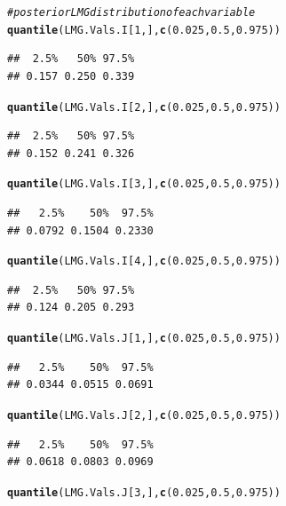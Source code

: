 \documentclass[11pt,a4paper,twoside]{book}\usepackage[]{graphicx}\usepackage[]{color}
\makeatletter
\newcommand{\hlnum}[1]{\textcolor[rgb]{0.686,0.059,0.569}{#1}}%
\newcommand{\hlcom}[1]{\textcolor[rgb]{0.678,0.584,0.686}{\textit{#1}}}%
\newcommand{\hlstd}[1]{\textcolor[rgb]{0.345,0.345,0.345}{#1}}%
\newcommand{\hlkwd}[1]{\textcolor[rgb]{0.737,0.353,0.396}{\textbf{#1}}}%
\newenvironment{kframe}{%
 \def\at@end@of@kframe{}%
 \ifinner\ifhmode%
  \def\at@end@of@kframe{\end{minipage}}%
  \begin{minipage}{\columnwidth}%
 \fi\fi%
 \def\FrameCommand##1{\hskip\@totalleftmargin \hskip-\fboxsep
 \colorbox{shadecolor}{##1}\hskip-\fboxsep
     \hskip-\linewidth \hskip-\@totalleftmargin \hskip\columnwidth}%
 \MakeFramed {\advance\hsize-\width
   \@totalleftmargin\z@ \linewidth\hsize
   \@setminipage}}%
 {\par\unskip\endMakeFramed%
 \at@end@of@kframe}
\newenvironment{knitrout}{}{} %
\makeatother
\begin{document}
\begin{knitrout}
\begin{kframe}
\begin{alltt}
\hlcom{# posterior LMG distribution of each variable}
\hlkwd{quantile}\hlstd{(LMG.Vals.I[}\hlnum{1}\hlstd{,],} \hlkwd{c}\hlstd{(}\hlnum{0.025}\hlstd{,} \hlnum{0.5}\hlstd{,} \hlnum{0.975}\hlstd{))}
\end{alltt}
\begin{verbatim}
##  2.5%   50% 97.5% 
## 0.157 0.250 0.339
\end{verbatim}
\begin{alltt}
\hlkwd{quantile}\hlstd{(LMG.Vals.I[}\hlnum{2}\hlstd{,],} \hlkwd{c}\hlstd{(}\hlnum{0.025}\hlstd{,} \hlnum{0.5}\hlstd{,} \hlnum{0.975}\hlstd{))}
\end{alltt}
\begin{verbatim}
##  2.5%   50% 97.5% 
## 0.152 0.241 0.326
\end{verbatim}
\begin{alltt}
\hlkwd{quantile}\hlstd{(LMG.Vals.I[}\hlnum{3}\hlstd{,],} \hlkwd{c}\hlstd{(}\hlnum{0.025}\hlstd{,} \hlnum{0.5}\hlstd{,} \hlnum{0.975}\hlstd{))}
\end{alltt}
\begin{verbatim}
##   2.5%    50%  97.5% 
## 0.0792 0.1504 0.2330
\end{verbatim}
\begin{alltt}
\hlkwd{quantile}\hlstd{(LMG.Vals.I[}\hlnum{4}\hlstd{,],} \hlkwd{c}\hlstd{(}\hlnum{0.025}\hlstd{,} \hlnum{0.5}\hlstd{,} \hlnum{0.975}\hlstd{))}
\end{alltt}
\begin{verbatim}
##  2.5%   50% 97.5% 
## 0.124 0.205 0.293
\end{verbatim}
\begin{alltt}
\hlkwd{quantile}\hlstd{(LMG.Vals.J[}\hlnum{1}\hlstd{,],} \hlkwd{c}\hlstd{(}\hlnum{0.025}\hlstd{,} \hlnum{0.5}\hlstd{,} \hlnum{0.975}\hlstd{))}
\end{alltt}
\begin{verbatim}
##   2.5%    50%  97.5% 
## 0.0344 0.0515 0.0691
\end{verbatim}
\begin{alltt}
\hlkwd{quantile}\hlstd{(LMG.Vals.J[}\hlnum{2}\hlstd{,],} \hlkwd{c}\hlstd{(}\hlnum{0.025}\hlstd{,} \hlnum{0.5}\hlstd{,} \hlnum{0.975}\hlstd{))}
\end{alltt}
\begin{verbatim}
##   2.5%    50%  97.5% 
## 0.0618 0.0803 0.0969
\end{verbatim}
\begin{alltt}
\hlkwd{quantile}\hlstd{(LMG.Vals.J[}\hlnum{3}\hlstd{,],} \hlkwd{c}\hlstd{(}\hlnum{0.025}\hlstd{,} \hlnum{0.5}\hlstd{,} \hlnum{0.975}\hlstd{))}

\end{alltt}
\end{kframe}
\end{knitrout}
\end{document}
